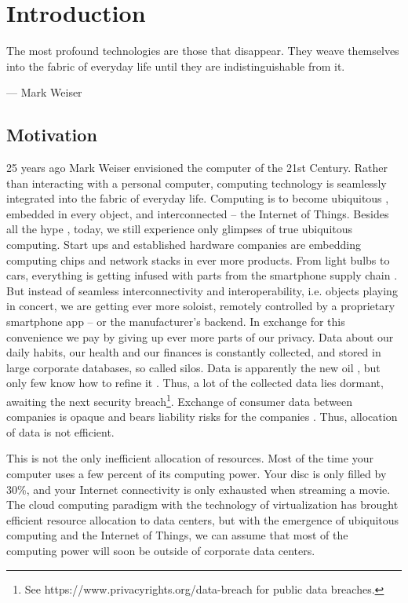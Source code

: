 \chapter{Introduction}
\label{sec:introduction}

\epigraph{The most profound technologies are those that disappear. They weave themselves into the
fabric of everyday life until they are indistinguishable from it.}{--- \textup{Mark Weiser}}

\section{Motivation}

25 years ago Mark Weiser envisioned the computer of the 21st Century. Rather than interacting with a personal computer, computing technology is seamlessly integrated into the fabric of everyday life. Computing is to become ubiquitous \parencite{weiser:13609162}, embedded in every object, and interconnected -- the Internet of Things.
Besides all the hype \parencite{Gartner:2015,manyika2015unlocking}, today, we still experience only glimpses of true ubiquitous computing. Start ups and established hardware companies are embedding computing chips and network stacks in ever more products. From light bulbs to cars, everything is getting infused with parts from the smartphone supply chain \parencite{Evans:2015,Evans:2016}. But instead of seamless interconnectivity and interoperability, i.e. objects playing in concert, we are getting ever more soloist, remotely controlled by a proprietary smartphone app -- or the manufacturer's backend. In exchange for this convenience we pay by giving up ever more parts of our privacy. Data about our daily habits, our health and our finances is constantly collected, and stored in large corporate databases, so called silos. Data is apparently the new oil \parencite{schwab2011personal}, but only few know how to refine it \parencite{manyika2015unlocking}. Thus, a lot of the collected data lies dormant, awaiting the next security breach\footnote{See https://www.privacyrights.org/data-breach for public data breaches.}. Exchange of consumer data between companies is opaque and bears liability risks for the companies \parencite{ISI:000330253700010}. Thus, allocation of data is not efficient. 

This is not the only inefficient allocation of resources. Most of the time your computer uses a few percent of its computing power. Your disc is only filled by 30\%, and your Internet connectivity is only exhausted when streaming a movie. The cloud computing paradigm \parencite{Hayes:2008:CC:1364782.1364786,Armbrust:2010:VCC:1721654.1721672} with the technology of virtualization \parencite{barham2003xen} has brought efficient resource allocation to data centers, but with the emergence of ubiquitous computing and the Internet of Things, we can assume that most of the computing power will soon be outside of corporate data centers. 

